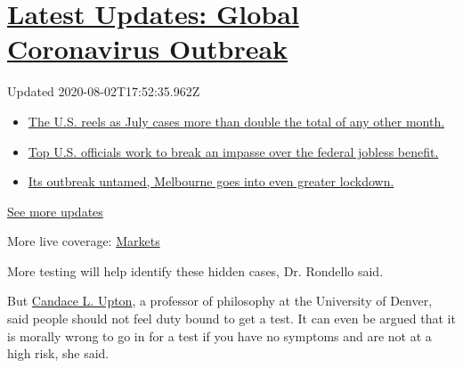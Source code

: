 \hypertarget{latest-updates-global-coronavirus-outbreak}{%
\section{\texorpdfstring{\href{https://www.nytimes3xbfgragh.onion/2020/08/01/world/coronavirus-covid-19.html?action=click\&pgtype=Article\&state=default\&region=MAIN_CONTENT_1\&context=storylines_live_updates}{Latest
Updates: Global Coronavirus
Outbreak}}{Latest Updates: Global Coronavirus Outbreak}}\label{latest-updates-global-coronavirus-outbreak}}

Updated 2020-08-02T17:52:35.962Z

\begin{itemize}
\tightlist
\item
  \href{https://www.nytimes3xbfgragh.onion/2020/08/01/world/coronavirus-covid-19.html?action=click\&pgtype=Article\&state=default\&region=MAIN_CONTENT_1\&context=storylines_live_updates\#link-34047410}{The
  U.S. reels as July cases more than double the total of any other
  month.}
\item
  \href{https://www.nytimes3xbfgragh.onion/2020/08/01/world/coronavirus-covid-19.html?action=click\&pgtype=Article\&state=default\&region=MAIN_CONTENT_1\&context=storylines_live_updates\#link-780ec966}{Top
  U.S. officials work to break an impasse over the federal jobless
  benefit.}
\item
  \href{https://www.nytimes3xbfgragh.onion/2020/08/01/world/coronavirus-covid-19.html?action=click\&pgtype=Article\&state=default\&region=MAIN_CONTENT_1\&context=storylines_live_updates\#link-2bc8948}{Its
  outbreak untamed, Melbourne goes into even greater lockdown.}
\end{itemize}

\href{https://www.nytimes3xbfgragh.onion/2020/08/01/world/coronavirus-covid-19.html?action=click\&pgtype=Article\&state=default\&region=MAIN_CONTENT_1\&context=storylines_live_updates}{See
more updates}

More live coverage:
\href{https://www.nytimes3xbfgragh.onion/live/2020/07/31/business/stock-market-today-coronavirus?action=click\&pgtype=Article\&state=default\&region=MAIN_CONTENT_1\&context=storylines_live_updates}{Markets}

More testing will help identify these hidden cases, Dr. Rondello said.

But
\href{https://www.du.edu/ahss/philosophy/faculty_staff/upton_candace.html}{Candace
L. Upton}, a professor of philosophy at the University of Denver, said
people should not feel duty bound to get a test. It can even be argued
that it is morally wrong to go in for a test if you have no symptoms and
are not at a high risk, she said.

